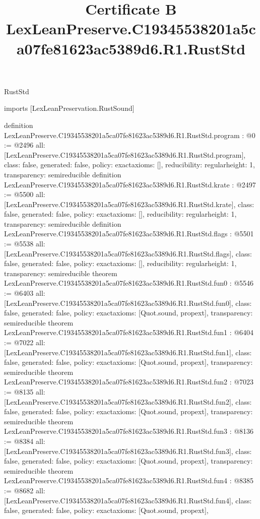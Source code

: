 \begin{lexlean}{RustStd}
\title{Certificate B LexLeanPreserve.C19345538201a5ca07fe81623ac5389d6.R1.RustStd}
\begin{coremodule}
imports [LexLeanPreservation.RustSound]

definition LexLeanPreserve.C19345538201a5ca07fe81623ac5389d6.R1.RustStd.program : @0 := @2496 {
  all: [LexLeanPreserve.C19345538201a5ca07fe81623ac5389d6.R1.RustStd.program],
  class: false,
  generated: false,
  policy: exact{axioms: []},
  reducibility: regular{height: 1},
  transparency: semireducible
}
definition LexLeanPreserve.C19345538201a5ca07fe81623ac5389d6.R1.RustStd.krate : @2497 := @5500 {
  all: [LexLeanPreserve.C19345538201a5ca07fe81623ac5389d6.R1.RustStd.krate],
  class: false,
  generated: false,
  policy: exact{axioms: []},
  reducibility: regular{height: 1},
  transparency: semireducible
}
definition LexLeanPreserve.C19345538201a5ca07fe81623ac5389d6.R1.RustStd.flags : @5501 := @5538 {
  all: [LexLeanPreserve.C19345538201a5ca07fe81623ac5389d6.R1.RustStd.flags],
  class: false,
  generated: false,
  policy: exact{axioms: []},
  reducibility: regular{height: 1},
  transparency: semireducible
}
theorem LexLeanPreserve.C19345538201a5ca07fe81623ac5389d6.R1.RustStd.fun0 : @5546 := @6403 {
  all: [LexLeanPreserve.C19345538201a5ca07fe81623ac5389d6.R1.RustStd.fun0],
  class: false,
  generated: false,
  policy: exact{axioms: [Quot.sound, propext]},
  transparency: semireducible
}
theorem LexLeanPreserve.C19345538201a5ca07fe81623ac5389d6.R1.RustStd.fun1 : @6404 := @7022 {
  all: [LexLeanPreserve.C19345538201a5ca07fe81623ac5389d6.R1.RustStd.fun1],
  class: false,
  generated: false,
  policy: exact{axioms: [Quot.sound, propext]},
  transparency: semireducible
}
theorem LexLeanPreserve.C19345538201a5ca07fe81623ac5389d6.R1.RustStd.fun2 : @7023 := @8135 {
  all: [LexLeanPreserve.C19345538201a5ca07fe81623ac5389d6.R1.RustStd.fun2],
  class: false,
  generated: false,
  policy: exact{axioms: [Quot.sound, propext]},
  transparency: semireducible
}
theorem LexLeanPreserve.C19345538201a5ca07fe81623ac5389d6.R1.RustStd.fun3 : @8136 := @8384 {
  all: [LexLeanPreserve.C19345538201a5ca07fe81623ac5389d6.R1.RustStd.fun3],
  class: false,
  generated: false,
  policy: exact{axioms: [Quot.sound, propext]},
  transparency: semireducible
}
theorem LexLeanPreserve.C19345538201a5ca07fe81623ac5389d6.R1.RustStd.fun4 : @8385 := @8682 {
  all: [LexLeanPreserve.C19345538201a5ca07fe81623ac5389d6.R1.RustStd.fun4],
  class: false,
  generated: false,
  policy: exact{axioms: [Quot.sound, propext]},
}
\end{coremodule}
\end{lexlean}
